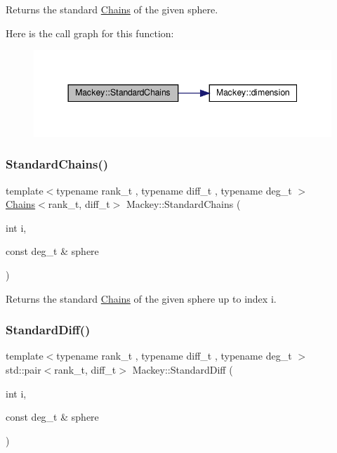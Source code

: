 Returns the standard \hyperlink{classMackey_1_1Chains}{Chains} of the given sphere. 

Here is the call graph for this function\+:\nopagebreak
\begin{figure}[H]
\begin{center}
\leavevmode
\includegraphics[width=344pt]{namespaceMackey_a425b988266cedec0299fb539d99179b1_cgraph}
\end{center}
\end{figure}
\mbox{\label{namespaceMackey_aac9deeccbe291d1dd17df46a3d7c1f2b}} 
\subsubsection{\texorpdfstring{Standard\+Chains()}{StandardChains()}\hspace{0.1cm}{\footnotesize\ttfamily [2/2]}}
{\footnotesize\ttfamily template$<$typename rank\+\_\+t , typename diff\+\_\+t , typename deg\+\_\+t $>$ \\
\hyperlink{classMackey_1_1Chains}{Chains}$<$rank\+\_\+t, diff\+\_\+t$>$ Mackey\+::\+Standard\+Chains (\begin{DoxyParamCaption}\item[{int}]{i,  }\item[{const deg\+\_\+t \&}]{sphere }\end{DoxyParamCaption})}



Returns the standard \hyperlink{classMackey_1_1Chains}{Chains} of the given sphere up to index i. 

\mbox{\label{namespaceMackey_a4b31e1685ed5771bcced308b3b13c7f0}} 
\subsubsection{\texorpdfstring{Standard\+Diff()}{StandardDiff()}}
{\footnotesize\ttfamily template$<$typename rank\+\_\+t , typename diff\+\_\+t , typename deg\+\_\+t $>$ \\
std\+::pair$<$rank\+\_\+t, diff\+\_\+t$>$ Mackey\+::\+Standard\+Diff (\begin{DoxyParamCaption}\item[{int}]{i,  }\item[{const deg\+\_\+t \&}]{sphere }\end{DoxyParamCaption})}



